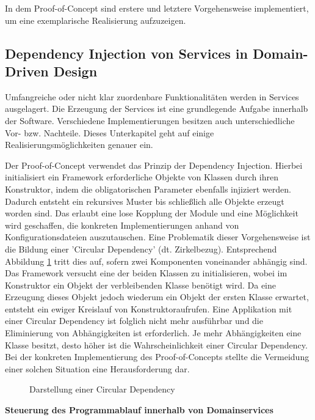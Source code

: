 In dem Proof-of-Concept sind erstere und letztere Vorgehensweise implementiert, um eine exemplarische Realisierung aufzuzeigen.


\subsection{Dependency Injection von Services in Domain-Driven Design}

Umfangreiche oder nicht klar zuordenbare Funktionalitäten werden in Services ausgelagert. Die Erzeugung der Services ist eine grundlegende Aufgabe innerhalb der Software. Verschiedene Implementierungen besitzen auch unterschiedliche Vor- bzw. Nachteile. Dieses Unterkapitel geht auf einige Realisierungsmöglichkeiten genauer ein. 

Der Proof-of-Concept verwendet das Prinzip der Dependency Injection. Hierbei initialisiert ein Framework erforderliche Objekte von Klassen durch ihren Konstruktor, indem die obligatorischen Parameter ebenfalls injiziert werden. Dadurch entsteht ein rekursives Muster bis schließlich alle Objekte erzeugt worden sind. Das erlaubt eine lose Kopplung der Module und eine Möglichkeit wird geschaffen, die konkreten Implementierungen anhand von Konfigurationsdateien auszutauschen. Eine Problematik dieser Vorgehensweise ist die Bildung einer 'Circular Dependency' (dt. Zirkelbezug). Entsprechend Abbildung \ref{fig:circulardependency} tritt dies auf, sofern zwei Komponenten voneinander abhängig sind. Das Framework versucht eine der beiden Klassen zu initialisieren, wobei im Konstruktor ein Objekt der verbleibenden Klasse benötigt wird. Da eine Erzeugung dieses Objekt jedoch wiederum ein Objekt der ersten Klasse erwartet, entsteht ein ewiger Kreislauf von Konstruktoraufrufen. Eine Applikation mit einer Circular Dependency ist folglich nicht mehr ausführbar und die Eliminierung von Abhängigkeiten ist erforderlich. Je mehr Abhängigkeiten eine Klasse besitzt, desto höher ist die Wahrscheinlichkeit einer Circular Dependency. Bei der konkreten Implementierung des Proof-of-Concepts stellte die Vermeidung einer solchen Situation eine Herausforderung dar. \cite[S. 93ff.]{Suryanarayana.2015}

\begin{figure}[htbp]
	\centering
	\footnotesize
	
	\caption{Darstellung einer Circular Dependency}
	\label{fig:circulardependency}
\end{figure}


\textbf{Steuerung des Programmablauf innerhalb von Domainservices}

